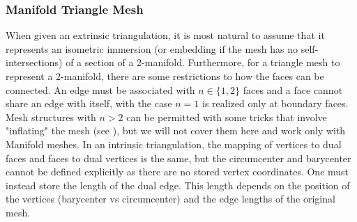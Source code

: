 \subsubsection*{Manifold Triangle Mesh}
When given an extrinsic triangulation, it is most natural to assume that it represents an isometric immersion (or embedding if the mesh has no self-intersections) of a section of a 2-manifold. Furthermore, for a triangle mesh to represent a 2-manifold, there are some restrictions to how the faces can be connected. An edge must be associated with $n \in \{1, 2\}$ faces and a face cannot share an edge with itself, with the case $n=1$ is realized only at boundary faces. Mesh structures with $n>2$ can be permitted with some tricks that involve "inflating" the mesh (see \cite{nonmanifold_laplacian}), but we will not cover them here and work only with Manifold meshes.
In an intrinsic triangulation, the mapping of vertices to dual faces and faces to dual vertices is the same, but the circumcenter and barycenter cannot be defined explicitly as there are no stored vertex coordinates. One must instead store the length of the dual edge. This length depends on the position of the vertices (barycenter vs circumcenter) and the edge lengths of the original mesh.
